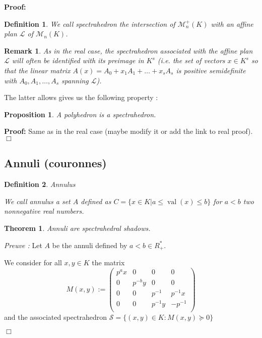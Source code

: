 \documentclass[a4paper,12pt]{article}
\newenvironment{proof}{\hbox{}\vspace{-0.5cm} {\bf Proof:}}{\hfill $\Box$ \\}
\newtheorem{theorem}{Theorem}
\newtheorem{proposition}{Proposition}
\newtheorem{definition}{Definition}
\newtheorem{remark}{Remark}
\DeclareMathOperator{\val}{val}
\begin{document}
\begin{proof}
%


\begin{definition}
	We call {\it spectrahedron} the intersection of $\mathcal{M}_n^+\left( K \right) $ with an affine plan $\mathcal{L}$ of $\mathcal{M}_n\left( K \right) $.
\end{definition}

\begin{remark}
	As in the real case, the spectrahedron associated with the affine plan $\mathcal{L}$ will often be identified with its preimage in $K^s$ (i.e. the set of vectors $x \in K ^s$ so that the linear matrix $A(x) = A_0 + x_1A_1 + \ldots + x_sA_s$ is positive semidefinite with $A_0,A_1,\ldots,A_s$ spanning $\mathcal{L}$). 
\end{remark}

The latter allows gives us the following property :
\begin{proposition}
	A polyhedron is a spectrahedron.
\end{proposition}
\begin{proof}
	Same as in the real case (maybe modify it or add the link to real proof).
\end{proof}


\subsection{Annuli (couronnes)}
\begin{definition}
	Annulus
	
	We call {\it annulus} a set $A$ defined as $C = \{x \in K  | a\le \val\left(x\right) \le b\} $ for $a < b$ two nonnegative real numbers.
\end{definition}


\begin{theorem}
	Annuli are spectrahedral shadows.
\end{theorem} 

\textit{Preuve :}
Let $A$ be the annuli defined by $a<b \in R^*_+$.

We consider for all $x,y \in K $ the matrix  $$M(x,y) :=
\begin{pmatrix} 
	p^ax & 0 & 0 & 0 \\
	0 & p^{-b}y & 0 & 0 \\
	0 & 0 & p^{-1} & p^{-1}x \\
	0 & 0 & p^{-1}y & - p^{-1}  \\
\end{pmatrix} $$ and the associated spectrahedron $\mathcal{S}= \{(x,y) \in K  : M(x,y) \succeq 0\} $


\end{proof}
\end{document}
